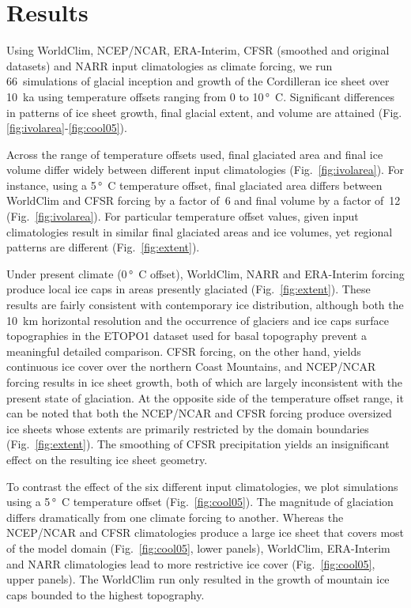 \section{Results}
\label{sec:results}

Using WorldClim, NCEP/NCAR, ERA-Interim, CFSR (smoothed and original datasets) and NARR input climatologies as climate forcing, we run 66~simulations of glacial inception and growth of the Cordilleran ice sheet over 10~ka using temperature offsets ranging from 0 to 10\,\unit{\degree C}. Significant differences in patterns of ice sheet growth, final glacial extent, and volume are attained (Fig. \ref{fig:ivolarea}-\ref{fig:cool05}).

Across the range of temperature offsets used, final glaciated area and final ice volume differ widely between different input climatologies (Fig.~\ref{fig:ivolarea}). For instance, using a 5\,\unit{\degree C} temperature offset, final glaciated area differs between WorldClim and CFSR forcing by a factor of~6 and final volume by a factor of~12 (Fig.~\ref{fig:ivolarea}). For particular temperature offset values, given input climatologies result in similar final glaciated areas and ice volumes, yet regional patterns are different (Fig.~\ref{fig:extent}).

Under present climate (0\,\unit{\degree C} offset), WorldClim, NARR and ERA-Interim forcing produce local ice caps in areas presently glaciated (Fig.~\ref{fig:extent}). These results are fairly consistent with contemporary ice distribution, although both the 10~km horizontal resolution and the occurrence of glaciers and ice caps surface topographies in the ETOPO1 dataset used for basal topography prevent a meaningful detailed comparison. CFSR forcing, on the other hand, yields continuous ice cover over the northern Coast Mountains, and NCEP/NCAR forcing results in ice sheet growth, both of which are largely inconsistent with the present state of glaciation. At the opposite side of the temperature offset range, it can be noted that both the NCEP/NCAR and CFSR forcing produce oversized ice sheets whose extents are primarily restricted by the domain boundaries (Fig.~\ref{fig:extent}). The smoothing of CFSR precipitation yields an insignificant effect on the resulting ice sheet geometry.

To contrast the effect of the six different input climatologies, we plot simulations using a 5\,\unit{\degree C} temperature offset (Fig.~\ref{fig:cool05}). The magnitude of glaciation differs dramatically from one climate forcing to another. Whereas the NCEP/NCAR and CFSR climatologies produce a large ice sheet that covers most of the model domain (Fig.~\ref{fig:cool05}, lower panels), WorldClim, ERA-Interim and NARR climatologies lead to more restrictive ice cover (Fig.~\ref{fig:cool05}, upper panels). The WorldClim run only resulted in the growth of mountain ice caps bounded to the highest topography.
